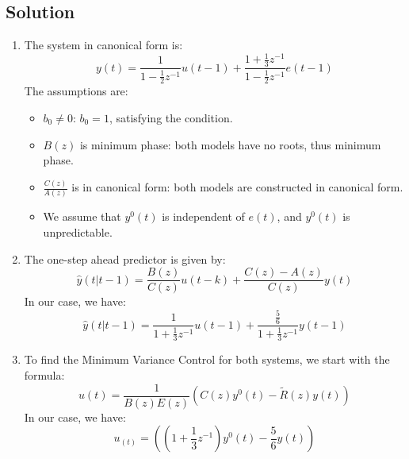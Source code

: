 \subsection*{Solution}
\begin{enumerate}
    \item The system in canonical form is:
        \[y(t)=\dfrac{1}{1-\frac{1}{2}z^{-1}}u(t-1)+\dfrac{1+\frac{1}{3}z^{-1}}{1-\frac{1}{2}z^{-1}}e(t-1)\]
        The assumptions are:
        \begin{itemize}
            \item $b_0\neq 0$: $b_0=1$, satisfying the condition.
            \item $B(z)$ is minimum phase: both models have no roots, thus minimum phase.
            \item $\frac{C(z)}{A(z)}$ is in canonical form: both models are constructed in canonical form.
            \item We assume that $y^0(t)$ is independent of $e(t)$, and $y^0(t)$ is unpredictable. 
        \end{itemize}
    \item The one-step ahead predictor is given by:
        \[\hat{y}(t|t-1)=\dfrac{B(z)}{C(z)}u(t-k)+\dfrac{C(z)-A(z)}{C(z)}y(t)\]
        In our case, we have:
        \[\hat{y}(t|t-1)=\dfrac{1}{1+\frac{1}{3}z^{-1}}u(t-1)+\dfrac{\frac{5}{6}}{1+\frac{1}{3}z^{-1}}y(t-1)\]
    \item To find the Minimum Variance Control for both systems, we start with the formula:
        \[u(t)=\dfrac{1}{B(z)E(z)}\left(C(z)y^0(t)-\tilde{R}(z)y(t)\right)\]
        In our case, we have:
        \[u_(t)=\left(\left(1+\dfrac{1}{3}z^{-1}\right)y^0(t)-\dfrac{5}{6}y(t)\right)\]


\end{enumerate}
